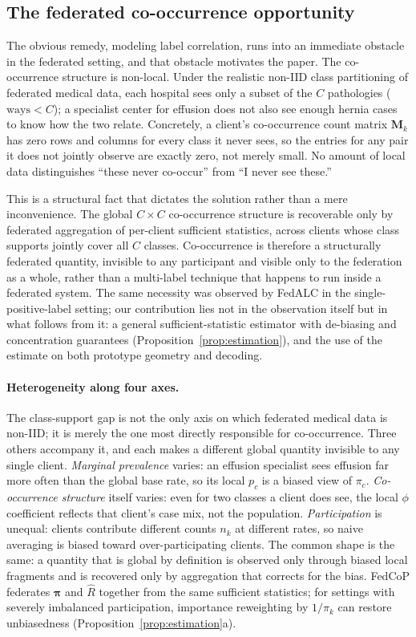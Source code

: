 \documentclass[11pt,a4paper]{article}
\theoremstyle{definition}
\newcommand{\Rhat}{\widehat{R}}
\begin{document}
\subsection{The federated co-occurrence opportunity}

The obvious remedy, modeling label correlation, runs into an immediate obstacle in the federated setting, and that obstacle motivates the paper. The co-occurrence structure is non-local. Under the realistic non-IID class partitioning of federated medical data, each hospital sees only a subset of the $C$ pathologies ($\text{ways}<C$); a specialist center for effusion does not also see enough hernia cases to know how the two relate. Concretely, a client's co-occurrence count matrix $\mathbf{M}_k$ has zero rows and columns for every class it never sees, so the entries for any pair it does not jointly observe are exactly zero, not merely small. No amount of local data distinguishes ``these never co-occur'' from ``I never see these.''

This is a structural fact that dictates the solution rather than a mere inconvenience. The global $C\times C$ co-occurrence structure is recoverable only by federated aggregation of per-client sufficient statistics, across clients whose class supports jointly cover all $C$ classes. Co-occurrence is therefore a structurally federated quantity, invisible to any participant and visible only to the federation as a whole, rather than a multi-label technique that happens to run inside a federated system. The same necessity was observed by FedALC \citep{an2024fedalc} in the single-positive-label setting; our contribution lies not in the observation itself but in what follows from it: a general sufficient-statistic estimator with de-biasing and concentration guarantees (Proposition~\ref{prop:estimation}), and the use of the estimate on both prototype geometry and decoding.

\paragraph{Heterogeneity along four axes.}
The class-support gap is not the only axis on which federated medical data is non-IID; it is merely the one most directly responsible for co-occurrence. Three others accompany it, and each makes a different global quantity invisible to any single client. \emph{Marginal prevalence} varies: an effusion specialist sees effusion far more often than the global base rate, so its local $p_c$ is a biased view of $\pi_c$. \emph{Co-occurrence structure} itself varies: even for two classes a client does see, the local $\phi$ coefficient reflects that client's case mix, not the population. \emph{Participation} is unequal: clients contribute different counts $n_k$ at different rates, so naive averaging is biased toward over-participating clients. The common shape is the same: a quantity that is global by definition is observed only through biased local fragments and is recovered only by aggregation that corrects for the bias. FedCoP federates $\boldsymbol\pi$ and $\Rhat$ together from the same sufficient statistics; for settings with severely imbalanced participation, importance reweighting by $1/\pi_k$ can restore unbiasedness (Proposition~\ref{prop:estimation}a).
\end{document}
